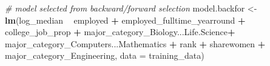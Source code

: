 \documentclass[
]{article}
\newenvironment{Shaded}{\begin{snugshade}}{\end{snugshade}}
\newcommand{\CommentTok}[1]{\textcolor[rgb]{0.56,0.35,0.01}{\textit{#1}}}
\newcommand{\DataTypeTok}[1]{\textcolor[rgb]{0.13,0.29,0.53}{#1}}
\newcommand{\KeywordTok}[1]{\textcolor[rgb]{0.13,0.29,0.53}{\textbf{#1}}}
\newcommand{\NormalTok}[1]{#1}
\newcommand{\OperatorTok}[1]{\textcolor[rgb]{0.81,0.36,0.00}{\textbf{#1}}}
\newcommand{\StringTok}[1]{\textcolor[rgb]{0.31,0.60,0.02}{#1}}
\begin{document}
\begin{Shaded}
\begin{Highlighting}[]
\CommentTok{# model selected from backward/forward selection }
\NormalTok{model.backfor <-}\StringTok{ }\KeywordTok{lm}\NormalTok{(log_median }\OperatorTok{~}\StringTok{ }\NormalTok{employed }\OperatorTok{+}\StringTok{ }\NormalTok{employed_fulltime_yearround }\OperatorTok{+}\StringTok{ }
\StringTok{                          }\NormalTok{college_job_prop }\OperatorTok{+}
\StringTok{                          }\NormalTok{major_category_Biology...Life.Science}\OperatorTok{+}
\StringTok{                          }\NormalTok{major_category_Computers...Mathematics }\OperatorTok{+}\StringTok{ }
\StringTok{                          }\NormalTok{rank }\OperatorTok{+}\StringTok{ }\NormalTok{sharewomen }\OperatorTok{+}\StringTok{ }\NormalTok{major_category_Engineering, }
                    \DataTypeTok{data =}\NormalTok{ training_data)}


\end{Highlighting}
\end{Shaded}
\end{document}
